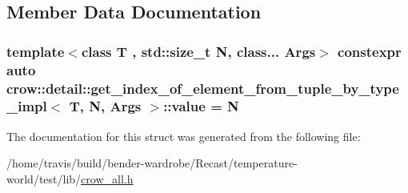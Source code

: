 \subsection{Member Data Documentation}
\hypertarget{structcrow_1_1detail_1_1get__index__of__element__from__tuple__by__type__impl_a5da6765892a4095a36260683d7f251b7}{
\subsubsection[{value}]{\setlength{\rightskip}{0pt plus 5cm}template$<$class T , std\-::size\-\_\-t N, class... Args$>$ constexpr auto {\bf crow\-::detail\-::get\-\_\-index\-\_\-of\-\_\-element\-\_\-from\-\_\-tuple\-\_\-by\-\_\-type\-\_\-impl}$<$ T, N, Args $>$\-::value = N\hspace{0.3cm}{\ttfamily [static]}}}\label{structcrow_1_1detail_1_1get__index__of__element__from__tuple__by__type__impl_a5da6765892a4095a36260683d7f251b7}


The documentation for this struct was generated from the following file\-:\begin{DoxyCompactItemize}
\item 
/home/travis/build/bender-\/wardrobe/\-Recast/temperature-\/world/test/lib/\hyperlink{crow__all_8h}{crow\-\_\-all.\-h}\end{DoxyCompactItemize}
